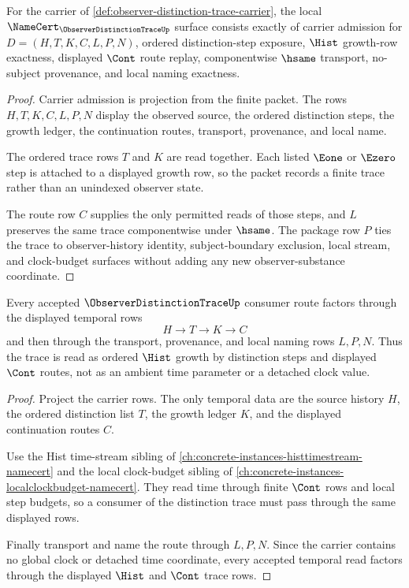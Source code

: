 \begin{theorem}
\label{thm:observer-distinction-trace-namecert-obligations}
For the carrier of \autoref{def:observer-distinction-trace-carrier}, the local $\NameCert_{\ObserverDistinctionTraceUp}$ surface consists exactly of carrier admission for $D=(H,T,K,C,L,P,N)$, ordered distinction-step exposure, $\Hist$ growth-row exactness, displayed $\Cont$ route replay, componentwise $\hsame$ transport, no-subject provenance, and local naming exactness.
\end{theorem}
\begin{proof}
Carrier admission is projection from the finite packet. The rows $H,T,K,C,L,P,N$ display the observed source, the ordered distinction steps, the growth ledger, the continuation routes, transport, provenance, and local name.

The ordered trace rows $T$ and $K$ are read together. Each listed $\Eone$ or $\Ezero$ step is attached to a displayed growth row, so the packet records a finite trace rather than an unindexed observer state.

The route row $C$ supplies the only permitted reads of those steps, and $L$ preserves the same trace componentwise under $\hsame$. The package row $P$ ties the trace to observer-history identity, subject-boundary exclusion, local stream, and clock-budget surfaces without adding any new observer-substance coordinate.
\end{proof}

\begin{theorem}
\label{thm:observer-distinction-trace-temporal-factorization}
Every accepted $\ObserverDistinctionTraceUp$ consumer route factors through the displayed temporal rows
$$
H \to T \to K \to C
$$
and then through the transport, provenance, and local naming rows $L,P,N$. Thus the trace is read as ordered $\Hist$ growth by distinction steps and displayed $\Cont$ routes, not as an ambient time parameter or a detached clock value.
\end{theorem}
\begin{proof}
Project the carrier rows. The only temporal data are the source history $H$, the ordered distinction list $T$, the growth ledger $K$, and the displayed continuation routes $C$.

Use the Hist time-stream sibling of \autoref{ch:concrete-instances-histtimestream-namecert} and the local clock-budget sibling of \autoref{ch:concrete-instances-localclockbudget-namecert}. They read time through finite $\Cont$ rows and local step budgets, so a consumer of the distinction trace must pass through the same displayed rows.

Finally transport and name the route through $L,P,N$. Since the carrier contains no global clock or detached time coordinate, every accepted temporal read factors through the displayed $\Hist$ and $\Cont$ trace rows.
\end{proof}


